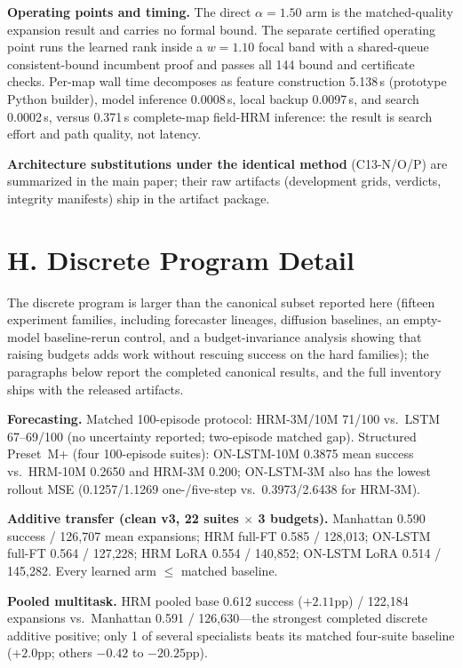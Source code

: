 \documentclass[letterpaper]{article} %
\newcommand{\stage}[1]{\textsc{#1}}
\begin{document}
\textbf{Operating points and timing.} The direct $\alpha{=}1.50$ arm is the matched-quality expansion result and carries no formal bound. The separate certified operating point runs the learned rank inside a $w{=}1.10$ focal band with a shared-queue consistent-bound incumbent proof and passes all 144 bound and certificate checks. Per-map wall time decomposes as feature construction 5.138\,s (prototype Python builder), model inference 0.0008\,s, local backup 0.0097\,s, and search 0.0002\,s, versus 0.371\,s complete-map field-HRM inference: the result is search effort and path quality, not latency.

\textbf{Architecture substitutions under the identical method} (\stage{C13-N/O/P}) are summarized in the main paper; their raw artifacts (development grids, verdicts, integrity manifests) ship in the artifact package.

\clearpage
\section{H. Discrete Program Detail}

The discrete program is larger than the canonical subset reported here (fifteen experiment families, including forecaster lineages, diffusion baselines, an empty-model baseline-rerun control, and a budget-invariance analysis showing that raising budgets adds work without rescuing success on the hard families); the paragraphs below report the completed canonical results, and the full inventory ships with the released artifacts.

\textbf{Forecasting.} Matched 100-episode protocol: HRM-3M/10M 71/100 vs.\ LSTM 67--69/100 (no uncertainty reported; two-episode matched gap). Structured Preset~M+ (four 100-episode suites): ON-LSTM-10M 0.3875 mean success vs.\ HRM-10M 0.2650 and HRM-3M 0.200; ON-LSTM-3M also has the lowest rollout MSE (0.1257/1.1269 one-/five-step vs.\ 0.3973/2.6438 for HRM-3M).

\textbf{Additive transfer (clean v3, 22 suites $\times$ 3 budgets).} Manhattan 0.590 success / 126{,}707 mean expansions; HRM full-FT 0.585 / 128{,}013; ON-LSTM full-FT 0.564 / 127{,}228; HRM LoRA 0.554 / 140{,}852; ON-LSTM LoRA 0.514 / 145{,}282. Every learned arm $\leq$ matched baseline.

\textbf{Pooled multitask.} HRM pooled base 0.612 success ($+2.11$pp) / 122{,}184 expansions vs.\ Manhattan 0.591 / 126{,}630---the strongest completed discrete additive positive; only 1 of several specialists beats its matched four-suite baseline ($+2.0$pp; others $-0.42$ to $-20.25$pp).
\end{document}
